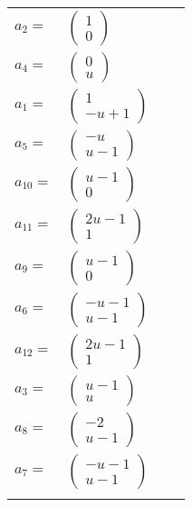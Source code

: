 \documentclass[1p]{elsarticle_modified}
\theoremstyle{definition}
\begin{document}
\begin{tabular}{m{7pt} m{180pt} m{7pt} m{180pt} }
\flushright $a_{2}=$&$\begin{pmatrix}1\\0\end{pmatrix}$ \\
\flushright $a_{4}=$&$\begin{pmatrix}0\\u\end{pmatrix}$ \\
\flushright $a_{1}=$&$\begin{pmatrix}1\\- u+1\end{pmatrix}$ \\
\flushright $a_{5}=$&$\begin{pmatrix}- u\\u-1\end{pmatrix}$ \\
\flushright $a_{10}=$&$\begin{pmatrix}u-1\\0\end{pmatrix}$ \\
\flushright $a_{11}=$&$\begin{pmatrix}2 u-1\\1\end{pmatrix}$ \\
\flushright $a_{9}=$&$\begin{pmatrix}u-1\\0\end{pmatrix}$ \\
\flushright $a_{6}=$&$\begin{pmatrix}- u-1\\u-1\end{pmatrix}$ \\
\flushright $a_{12}=$&$\begin{pmatrix}2 u-1\\1\end{pmatrix}$ \\
\flushright $a_{3}=$&$\begin{pmatrix}u-1\\u\end{pmatrix}$ \\
\flushright $a_{8}=$&$\begin{pmatrix}-2\\u-1\end{pmatrix}$ \\
\flushright $a_{7}=$&$\begin{pmatrix}- u-1\\u-1\end{pmatrix}$\\&\end{tabular}
\end{document}
